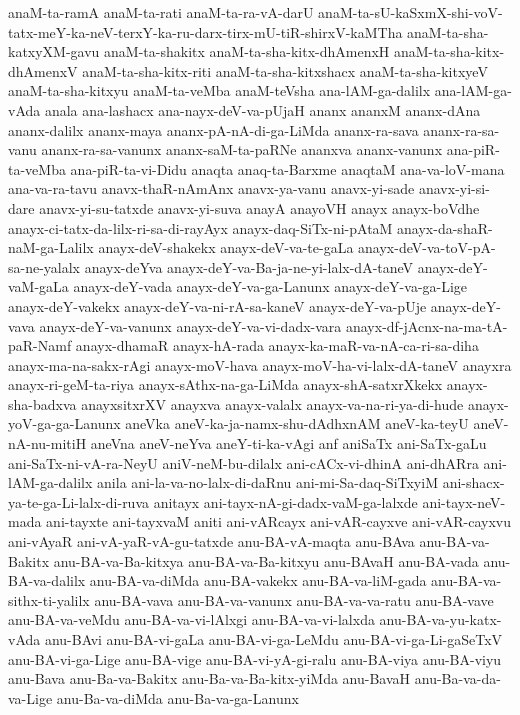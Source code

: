{anaM-ta-ramA
anaM-ta-rati
anaM-ta-ra-vA-darU
anaM-ta-sU-kaSxmX-shi-voV-tatx-meY-ka-neV-terxY-ka-ru-darx-tirx-mU-tiR-shirxV-kaMTha
anaM-ta-sha-katxyXM-gavu
anaM-ta-shakitx
anaM-ta-sha-kitx-dhAmenxH
anaM-ta-sha-kitx-dhAmenxV
anaM-ta-sha-kitx-riti
anaM-ta-sha-kitxshacx
anaM-ta-sha-kitxyeV
anaM-ta-sha-kitxyu
anaM-ta-veMba
anaM-teVsha
ana-lAM-ga-dalilx
ana-lAM-ga-vAda
anala
ana-lashacx
ana-nayx-deV-va-pUjaH
ananx
ananxM
ananx-dAna
ananx-dalilx
ananx-maya
ananx-pA-nA-di-ga-LiMda
ananx-ra-sava
ananx-ra-sa-vanu
ananx-ra-sa-vanunx
ananx-saM-ta-paRNe
ananxva
ananx-vanunx
ana-piR-ta-veMba
ana-piR-ta-vi-Didu
anaqta
anaq-ta-Barxme
anaqtaM
ana-va-loV-mana
ana-va-ra-tavu
anavx-thaR-nAmAnx
anavx-ya-vanu
anavx-yi-sade
anavx-yi-si-dare
anavx-yi-su-tatxde
anavx-yi-suva
anayA
anayoVH
anayx
anayx-boVdhe
anayx-ci-tatx-da-lilx-ri-sa-di-rayAyx
anayx-daq-SiTx-ni-pAtaM
anayx-da-shaR-naM-ga-Lalilx
anayx-deV-shakekx
anayx-deV-va-te-gaLa
anayx-deV-va-toV-pA-sa-ne-yalalx
anayx-deYva
anayx-deY-va-Ba-ja-ne-yi-lalx-dA-taneV
anayx-deY-vaM-gaLa
anayx-deY-vada
anayx-deY-va-ga-Lanunx
anayx-deY-va-ga-Lige
anayx-deY-vakekx
anayx-deY-va-ni-rA-sa-kaneV
anayx-deY-va-pUje
anayx-deY-vava
anayx-deY-va-vanunx
anayx-deY-va-vi-dadx-vara
anayx-df-jAcnx-na-ma-tA-paR-Namf
anayx-dhamaR
anayx-hA-rada
anayx-ka-maR-va-nA-ca-ri-sa-diha
anayx-ma-na-sakx-rAgi
anayx-moV-hava
anayx-moV-ha-vi-lalx-dA-taneV
anayxra
anayx-ri-geM-ta-riya
anayx-sAthx-na-ga-LiMda
anayx-shA-satxrXkekx
anayx-sha-badxva
anayxsitxrXV
anayxva
anayx-valalx
anayx-va-na-ri-ya-di-hude
anayx-yoV-ga-ga-Lanunx
aneVka
aneV-ka-ja-namx-shu-dAdhxnAM
aneV-ka-teyU
aneV-nA-nu-mitiH
aneVna
aneV-neYva
aneY-ti-ka-vAgi
anf
aniSaTx
ani-SaTx-gaLu
ani-SaTx-ni-vA-ra-NeyU
aniV-neM-bu-dilalx
ani-cACx-vi-dhinA
ani-dhARra
ani-lAM-ga-dalilx
anila
ani-la-va-no-lalx-di-daRnu
ani-mi-Sa-daq-SiTxyiM
ani-shacx-ya-te-ga-Li-lalx-di-ruva
anitayx
ani-tayx-nA-gi-dadx-vaM-ga-lalxde
ani-tayx-neV-mada
ani-tayxte
ani-tayxvaM
aniti
ani-vARcayx
ani-vAR-cayxve
ani-vAR-cayxvu
ani-vAyaR
ani-vA-yaR-vA-gu-tatxde
anu-BA-vA-maqta
anu-BAva
anu-BA-va-Bakitx
anu-BA-va-Ba-kitxya
anu-BA-va-Ba-kitxyu
anu-BAvaH
anu-BA-vada
anu-BA-va-dalilx
anu-BA-va-diMda
anu-BA-vakekx
anu-BA-va-liM-gada
anu-BA-va-sithx-ti-yalilx
anu-BA-vava
anu-BA-va-vanunx
anu-BA-va-va-ratu
anu-BA-vave
anu-BA-va-veMdu
anu-BA-va-vi-lAlxgi
anu-BA-va-vi-lalxda
anu-BA-va-yu-katx-vAda
anu-BAvi
anu-BA-vi-gaLa
anu-BA-vi-ga-LeMdu
anu-BA-vi-ga-Li-gaSeTxV
anu-BA-vi-ga-Lige
anu-BA-vige
anu-BA-vi-yA-gi-ralu
anu-BA-viya
anu-BA-viyu
anu-Bava
anu-Ba-va-Bakitx
anu-Ba-va-Ba-kitx-yiMda
anu-BavaH
anu-Ba-va-da-va-Lige
anu-Ba-va-diMda
anu-Ba-va-ga-Lanunx
}
